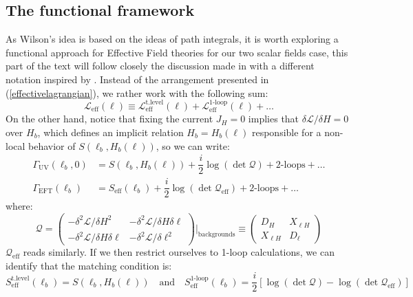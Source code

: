 \documentclass[11pt]{article}
\begin{document}
\subsection{The functional framework}
As Wilson's idea is based on the ideas of path integrals, it is worth exploring a functional approach for Effective Field theories for our two scalar fields case, this part of the text will follow closely the discussion made in \cite{Fuentes_Mart_n_2016} with a different notation inspired by \cite{Burgess_2007}. Instead of the arrangement presented in (\ref{effectivelagrangian}), we rather work with the following sum:
\begin{equation}
     \mathcal{L}_{\text{eff}}(\ell)\equiv \mathcal{L}^{\text{t.level}}_{\text{eff}}(\ell)+\mathcal{L}^{\text{1-loop}}_{\text{eff}}(\ell)+\ldots
\end{equation}
On the other hand, notice that fixing the current $J_H=0$ implies that $\delta \mathcal{L}/\delta H=0$ over $H_b$, which defines an implicit relation $H_b=H_b(\ell)$ responsible for a non-local behavior of $S(\ell_b,H_b(\ell))$, so we can write:
\begin{align}\label{effectiveactions2}
    \Gamma_{\text{UV}}(\ell_b,0)&=S(\ell_b,H_b(\ell))+\dfrac{i}{2}\log(\det \mathcal{Q})+\text{2-loops}+\ldots\\
    \Gamma_{\text{EFT}}(\ell_b)&=S_{\text{eff}}(\ell_b)+\dfrac{i}{2}\log(\det \mathcal{Q}_{\text{eff}})+\text{2-loops}+\ldots
\end{align}
where:
\begin{equation}\label{matrix}
    \mathcal{Q}= \begin{pmatrix}
       -\delta^2\mathcal{L}/\delta H^2 & -\delta^2\mathcal{L}/\delta H\delta \ell\\
        -\delta^2\mathcal{L}/\delta H\delta \ell & -\delta^2\mathcal{L}/\delta \ell^2
    \end{pmatrix}\Bigg|_{\text{backgrounds}}\equiv \begin{pmatrix}
        D_H & X_{\ell H}\\
        X_{\ell H} & D_\ell
    \end{pmatrix}
\end{equation}
$\mathcal{Q}_{\text{eff}}$ reads similarly. If we then restrict ourselves to 1-loop calculations, we can identify that the matching condition is:
\begin{equation}\label{actions}
    S^{\text{t.level}}_{\text{eff}}(\ell_b)=S(\ell_b,H_b(\ell))\quad\text{and}\quad  S^{\text{1-loop}}_{\text{eff}}(\ell_b)=\dfrac{i}{2}\left[\log(\det \mathcal{Q})-\log(\det \mathcal{Q}_{\text{eff}})  \right]
\end{equation}
\end{document}
